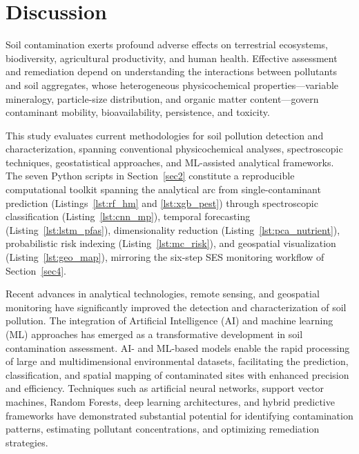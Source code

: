 \documentclass[environremediat,article,accept,pdftex,oneauthor]{Definitions/mdpi}
\begin{document}
\section{Discussion}\label{sec6}

{Soil contamination exerts profound adverse effects on terrestrial ecosystems, biodiversity, agricultural productivity, and human health. Effective assessment and remediation depend on understanding the interactions between pollutants and soil aggregates, whose heterogeneous physicochemical properties---variable mineralogy, particle-size distribution, and organic matter content---govern contaminant mobility, bioavailability, persistence, and toxicity.}

{This study evaluates current methodologies for soil pollution detection and characterization, spanning conventional physicochemical analyses, spectroscopic techniques, geostatistical approaches, and ML-assisted analytical frameworks. The seven Python scripts in Section~\ref{sec2} constitute a reproducible computational toolkit spanning the analytical arc from single-contaminant prediction (Listings~\ref{lst:rf_hm} and \ref{lst:xgb_pest}) through spectroscopic classification (Listing~\ref{lst:cnn_mp}), temporal forecasting (Listing~\ref{lst:lstm_pfas}), dimensionality reduction (Listing~\ref{lst:pca_nutrient}), probabilistic risk indexing (Listing~\ref{lst:mc_risk}), and geospatial visualization (Listing~\ref{lst:geo_map}), mirroring the six-step SES monitoring workflow of Section~\ref{sec4}.}

Recent advances in analytical technologies, remote sensing, and geospatial
monitoring have significantly improved the detection and characterization of
soil pollution. The integration of Artificial Intelligence (AI) and machine
learning (ML) approaches has emerged as a transformative development in soil
contamination assessment. AI- and ML-based models enable the rapid processing
of large and multidimensional environmental datasets, facilitating the
prediction, classification, and spatial mapping of contaminated sites with
enhanced precision and efficiency. Techniques such as artificial neural
networks, support vector machines, Random Forests, deep learning architectures,
and hybrid predictive frameworks have demonstrated substantial potential for
identifying contamination patterns, estimating pollutant concentrations, and
optimizing remediation strategies.
\end{document}
